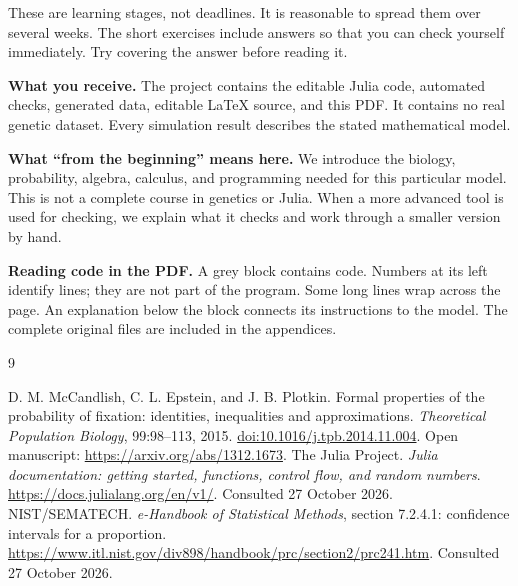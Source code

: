 \documentclass[11pt,a4paper,oneside]{report}
\begin{document}
These are learning stages, not deadlines. It is reasonable to spread them over several weeks. The short exercises include answers so that you can check yourself immediately. Try covering the answer before reading it.

\textbf{What you receive.} The project contains the editable Julia code, automated checks, generated data, editable LaTeX source, and this PDF. It contains no real genetic dataset. Every simulation result describes the stated mathematical model.

\textbf{What ``from the beginning'' means here.} We introduce the biology, probability, algebra, calculus, and programming needed for this particular model. This is not a complete course in genetics or Julia. When a more advanced tool is used for checking, we explain what it checks and work through a smaller version by hand.

\textbf{Reading code in the PDF.} A grey block contains code. Numbers at its left identify lines; they are not part of the program. Some long lines wrap across the page. An explanation below the block connects its instructions to the model. The complete original files are included in the appendices.

\tableofcontents
\clearpage
{}










\appendix


\begin{thebibliography}{9}
 D. M. McCandlish, C. L. Epstein, and J. B. Plotkin. Formal properties of the probability of fixation: identities, inequalities and approximations. \emph{Theoretical Population Biology}, 99:98--113, 2015. \href{https://doi.org/10.1016/j.tpb.2014.11.004}{doi:10.1016/j.tpb.2014.11.004}. Open manuscript: \url{https://arxiv.org/abs/1312.1673}.
 The Julia Project. \emph{Julia documentation: getting started, functions, control flow, and random numbers}. \url{https://docs.julialang.org/en/v1/}. Consulted 27 October 2026.
 NIST/SEMATECH. \emph{e-Handbook of Statistical Methods}, section 7.2.4.1: confidence intervals for a proportion. \url{https://www.itl.nist.gov/div898/handbook/prc/section2/prc241.htm}. Consulted 27 October 2026.
\end{thebibliography}
\end{document}
